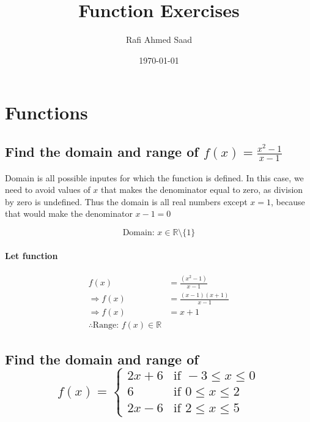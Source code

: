 \documentclass{article}
\title{Function Exercises}
\author{Rafi Ahmed Saad}
\date{\today}
\begin{document}
\maketitle %

\section{Functions}
\subsection{Find the domain and range of $f(x) = \frac{x^2 - 1}{x-1}$}

Domain is all possible inputes for which the function is defined. In this case,
we need to avoid values of $x$ that makes the denominator equal to zero, as
division by zero is undefined. Thus the domain is all real numbers except $x =
	1$, because that would make the denominator $x - 1 = 0$

\[ \text{Domain: } x \in \mathbb{R} \setminus \{1\} \]

\paragraph{Let function}
\begin{align*}
	f(x)             & = \frac{(x^2 - 1)}{x - 1}      \\
	\Rightarrow f(x) & = \frac{(x - 1)(x + 1)}{x - 1} \\
	\Rightarrow f(x) & = x + 1                        \\
	\therefore \text{Range: } f(x) \in \mathbb{R}
\end{align*}


\newpage
\subsection{Find the domain and range of \[
		f(x) = \begin{cases}
			2x + 6 & \text{if } -3 \leq x \leq 0 \\
			6      & \text{if } 0 \le x \le 2    \\
			2x - 6 & \text{if } 2 \leq x \leq 5
		\end{cases}
	\]}
\end{document}
